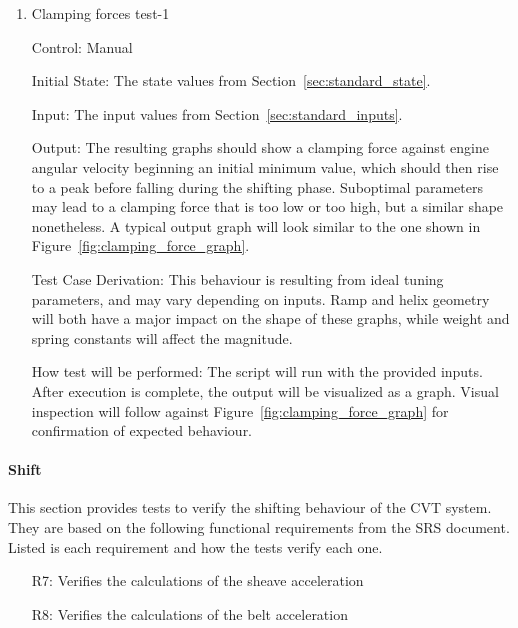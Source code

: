 \documentclass[12pt, titlepage]{article}
\begin{document}
\begin{enumerate}
  
  \item{Clamping forces test-1\\}
  
  Control: Manual
            
  Initial State: The state values from Section~\ref{sec:standard_state}.
  
  Input: The input values from Section~\ref{sec:standard_inputs}.
            
  Output: The resulting graphs should show a clamping force against engine angular velocity beginning an initial minimum value, which should then rise to a peak before falling during the shifting phase. Suboptimal parameters may lead to a clamping force that is too low or too high, but a similar shape nonetheless. A typical output graph will look similar to the one shown in Figure~\ref{fig:clamping_force_graph}.
  
  Test Case Derivation: This behaviour is resulting from ideal tuning parameters, and may vary depending on inputs. Ramp and helix geometry will both have a major impact on the shape of these graphs, while weight and spring constants will affect the magnitude.
  
  How test will be performed: The script will run with the provided inputs. After execution is complete, the output will be visualized as a graph. Visual inspection will follow against Figure~\ref{fig:clamping_force_graph} for confirmation of expected behaviour.
  
\end{enumerate}

\paragraph{Shift}

This section provides tests to verify the shifting behaviour of the CVT system.
They are based on the following functional requirements from the SRS document.
Listed is each requirement and how the tests verify each one.

\begin{itemize}
  \item [R7:] Verifies the calculations of the sheave acceleration
  \item [R8:] Verifies the calculations of the belt acceleration
\end{itemize}
\end{document}

